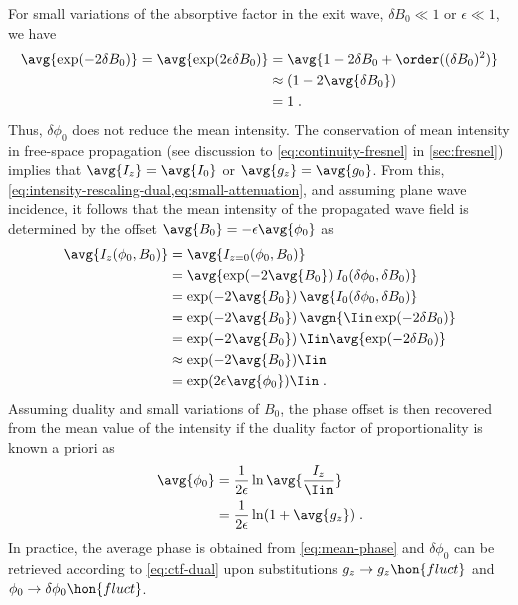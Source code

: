 \documentclass[
twoside,
openright,
titlepage,
numbers=noenddot,
headinclude,
fleqn,
a4paper,
footinclude=true,
cleardoublepage=empty,
abstractoff,
BCOR=5mm,
paper=a4,
fontsize=11pt,
british,ngerman,american,
]{scrreprt}
\begin{document}
For small variations of the absorptive factor in the exit wave,
$\delta B_0\ll 1$ or $\epsilon\ll 1$, we have
\begin{equation}
  \label{eq:small-attenuation}
  \begin{split}
    \avg{\exp(-2\delta B_0)} = \avg{\exp(2\epsilon\delta B_0)} 
    & = \avg{1-2\delta B_0 + \order((\delta B_0)^2)}
    \\ & \approx (1-2\avg{\delta B_0})
    \\ & = 1 \;.
  \end{split}
\end{equation}
Thus, $\delta\phi_0$ does not reduce the mean intensity.  The
conservation of mean intensity in free-space propagation (see
discussion to \cref{eq:continuity-fresnel} in \cref{sec:fresnel})
implies that $\avg{I_z}=\avg{I_0}$ or $\avg{g_z}=\avg{g_0}$.  From
this, \cref{eq:intensity-rescaling-dual,eq:small-attenuation}, and
assuming plane wave incidence, it follows that the mean intensity of
the propagated wave field is determined by the offset
$\avg{B_0}=-\epsilon\avg{\phi_0}$ as 
\begin{equation}
  \label{eq:mean-int}
  \begin{split}
    \avg{I_z(\phi_0,B_0)} 
       & = \avg{I_{z=0}(\phi_0,B_0)}
    \\ & = \avg{\exp(-2\avg{B_0})\, I_0(\delta\phi_0,\delta B_0)}
    \\ & = \exp(-2\avg{B_0})\, \avg{I_0(\delta \phi_0,\delta B_0)}
    \\ & = \exp(-2\avg{B_0})\, \avgn{\Iin\exp(-2\delta B_0)}
    \\ & = \exp(-2\avg{B_0})\, \Iin\avg{\exp(-2\delta B_0)}
    \\ & \approx \exp(-2\avg{B_0}) \Iin
    \\ & = \exp(2\epsilon\avg{\phi_0}) \Iin \;.
  \end{split}
\end{equation}
Assuming duality and small variations of $B_0$, the phase offset
is then recovered from the mean value of the intensity if the duality
factor of proportionality is known a priori as
\begin{equation}
  \label{eq:mean-phase}
  \begin{split}
    \avg{\phi_0} &=\frac{1}{2\epsilon}\ln\avg{\frac{I_z}{\Iin}}\\
    & =\frac{1}{2\epsilon}\ln(1+\avg{g_z}) \;.
  \end{split}
\end{equation}
In practice, the average phase is obtained from \cref{eq:mean-phase}
and $\delta\phi_0$ can be retrieved according to \cref{eq:ctf-dual}
upon substitutions $g_z\to g_z\hon{fluct}$ and $\phi_0\to
\delta\phi_0\hon{fluct}$.
\end{document}

